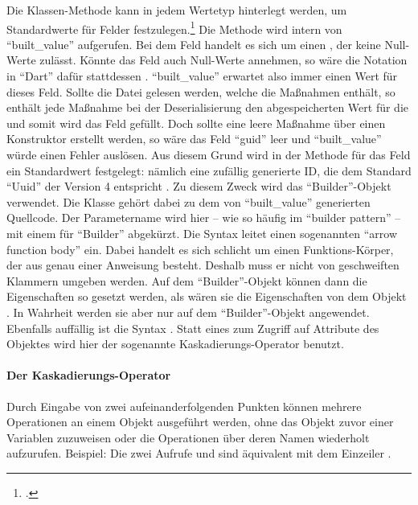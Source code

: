 Die Klassen-Methode  kann in jedem Wertetyp hinterlegt werden, um Standardwerte für Felder festzulegen.\footcite[Vgl.][]{BuiltValueChangelog}
Die Methode wird intern von \enquote{built_value} aufgerufen.
Bei dem Feld  handelt es sich um einen , der keine Null-Werte zulässt.
Könnte das Feld auch Null-Werte annehmen, so wäre die Notation in \enquote{Dart} dafür stattdessen . \enquote{built_value} erwartet also immer einen Wert für dieses Feld.
Sollte die Datei gelesen werden,
welche die Maßnahmen enthält, so enthält jede Maßnahme bei der Deserialisierung den abgespeicherten Wert für die  und somit wird das Feld gefüllt.
Doch sollte eine leere Maßnahme über einen Konstruktor erstellt werden, so wäre das Feld \enquote{guid} leer und \enquote{built_value} würde einen Fehler auslösen.
Aus diesem Grund wird in der Methode  für das Feld  ein Standardwert festgelegt: nämlich eine zufällig generierte ID,
die dem Standard \enquote{Uuid} der Version 4 entspricht .
Zu diesem Zweck wird das \enquote{Builder}-Objekt verwendet.
Die Klasse  gehört dabei zu dem von \enquote{built_value} generierten Quellcode.
Der Parametername wird hier -- wie so häufig im \enquote{builder pattern} -- mit einem  für \enquote{Builder} abgekürzt.
Die Syntax \IC{=>} leitet  einen sogenannten \enquote{arrow function body} ein.
Dabei handelt es sich schlicht um einen Funktions-Körper, der aus genau einer Anweisung besteht.
Deshalb muss er nicht von geschweiften Klammern umgeben werden.
Auf dem \enquote{Builder}-Objekt können dann die Eigenschaften so gesetzt werden, als wären sie die Eigenschaften von dem Objekt .
In Wahrheit werden sie aber nur auf dem \enquote{Builder}-Objekt angewendet.
Ebenfalls auffällig ist die Syntax .
Statt eines  zum Zugriff auf Attribute des Objektes wird hier der sogenannte Kaskadierungs-Operator  benutzt.

\paragraph{Der Kaskadierungs-Operator}

Durch Eingabe von zwei aufeinanderfolgenden Punkten  können mehrere Operationen an einem Objekt ausgeführt werden,
ohne das Objekt zuvor einer Variablen zuzuweisen oder die Operationen über deren Namen wiederholt aufzurufen.
Beispiel: Die zwei Aufrufe  und  sind äquivalent mit dem Einzeiler .


